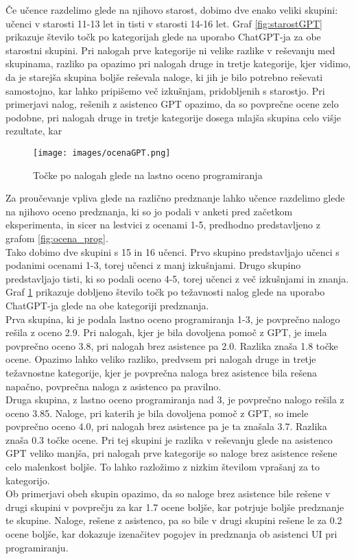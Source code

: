 \documentclass[a4paper,12pt,openright]{book}
\begin{document}
Če učence razdelimo glede na njihovo starost, dobimo dve enako veliki skupini: učenci v starosti 11-13 let in tisti v starosti 14-16 let. Graf \ref{fig:starostGPT} prikazuje število točk po kategorijah glede na uporabo ChatGPT-ja za obe starostni skupini. Pri nalogah prve kategorije ni velike razlike v reševanju med skupinama, razliko pa opazimo pri nalogah druge in tretje kategorije, kjer vidimo, da je starejša skupina boljše reševala naloge, ki jih je bilo potrebno reševati samostojno, kar lahko pripišemo več izkušnjam, pridobljenih s starostjo. Pri primerjavi nalog, rešenih z asistenco GPT opazimo, da so povprečne ocene zelo podobne, pri nalogah druge in tretje kategorije dosega mlajša skupina celo višje rezultate, kar \\



\pagebreak

\begin{figure}[H]
    \centering
    \texttt{[image: images/ocenaGPT.png]}
    \caption{Točke po nalogah glede na lastno oceno programiranja}
    \label{fig:ocenaGPT}
\end{figure}

Za proučevanje vpliva glede na različno predznanje lahko učence razdelimo glede na njihovo oceno predznanja, ki so jo podali v anketi pred začetkom eksperimenta, in sicer na lestvici z ocenami 1-5, predhodno predstavljeno z grafom \ref{fig:ocena_prog}. \\
Tako dobimo dve skupini s 15 in 16 učenci. Prvo skupino predstavljajo učenci s podanimi ocenami 1-3, torej učenci z manj izkušnjami. Drugo skupino predstavljajo tisti, ki so podali oceno 4-5, torej učenci z več izkušnjami in znanja. Graf \ref{fig:ocenaGPT} prikazuje dobljeno število točk po težavnosti nalog glede na uporabo ChatGPT-ja glede na obe kategoriji predznanja. \\
Prva skupina, ki je podala lastno oceno programiranja 1-3, je povprečno nalogo rešila z oceno 2.9. Pri nalogah, kjer je bila dovoljena pomoč z GPT, je imela povprečno oceno 3.8, pri nalogah brez asistence pa 2.0. Razlika znaša 1.8 točke ocene. Opazimo lahko veliko razliko, predvsem pri nalogah druge in tretje težavnostne kategorije, kjer je povprečna naloga brez asistence bila rešena napačno, povprečna naloga z asistenco pa pravilno. \\
Druga skupina, z lastno oceno programiranja nad 3, je povprečno nalogo rešila z oceno 3.85. Naloge, pri katerih je bila dovoljena pomoč z GPT, so imele povprečno oceno 4.0, pri nalogah brez asistence pa je ta znašala 3.7. Razlika znaša 0.3 točke ocene. Pri tej skupini je razlika v reševanju glede na asistenco GPT veliko manjša, pri nalogah prve kategorije so naloge brez asistence rešene celo malenkost boljše. To lahko razložimo z nizkim številom vprašanj za to kategorijo. \\
Ob primerjavi obeh skupin opazimo, da so naloge brez asistence bile rešene v drugi skupini v povprečju za kar 1.7 ocene boljše, kar potrjuje boljše predznanje te skupine. Naloge, rešene z asistenco, pa so bile v drugi skupini rešene le za 0.2 ocene boljše, kar dokazuje izenačitev pogojev in predznanja ob asistenci UI pri programiranju.
\end{document}
